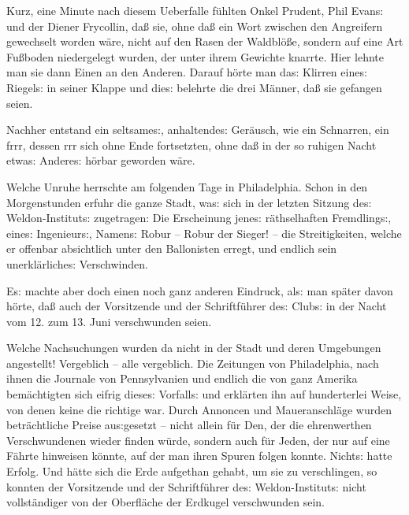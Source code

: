 \documentclass[oneside,12pt]{book}
\newcommand{\s}{s:}
\begin{document}
Kurz, eine Minute nach diesem Ueberfalle f\"uhlten Onkel Prudent,
Phil Evan{\s} und der Diener Frycollin, da{\ss} sie, ohne da{\ss} ein
Wort zwischen den Angreifern gewechselt worden w\"are, nicht auf den
Rasen der Waldbl\"o{\ss}e, sondern auf eine Art Fu{\ss}boden
niedergelegt wurden, der unter ihrem Gewichte knarrte. Hier lehnte
man sie dann Einen an den Anderen. Darauf h\"orte man da{\s} Klirren
eine{\s} Riegel{\s} in seiner Klappe und die{\s} belehrte die drei
M\"anner, da{\ss} sie gefangen seien.

Nachher entstand ein seltsame{\s}, anhaltende{\s} Ger\"ausch, wie ein
Schnarren, ein frrr, dessen rrr sich ohne Ende fortsetzten, ohne
da{\ss} in der so ruhigen Nacht etwa{\s} Andere{\s} h\"orbar geworden
w\"are.

\begin{center}
\makebox[15em]{\hrulefill}\bigskip
\end{center}

Welche Unruhe herrschte am folgenden Tage in Philadelphia. Schon in
den Morgenstunden erfuhr die ganze Stadt, wa{\s} sich in der letzten
Sitzung de{\s} Weldon-Institut{\s} zugetragen: Die Erscheinung
jene{\s} r\"athselhaften Fremdling{\s}, eine{\s} Ingenieur{\s},
Namen{\s} Robur -- Robur der Sieger! -- die Streitigkeiten, welche er
offenbar absichtlich unter den Ballonisten erregt, und endlich sein
unerkl\"arliche{\s} Verschwinden.

E{\s} machte aber doch einen noch ganz anderen Eindruck, al{\s} man
sp\"ater davon h\"orte, da{\ss} auch der Vorsitzende und der
Schriftf\"uhrer de{\s} Club{\s} in der Nacht vom 12. zum 13. Juni
verschwunden seien.

Welche Nachsuchungen wurden da nicht in der Stadt und deren
Umgebungen angestellt! Vergeblich -- alle vergeblich. Die Zeitungen
von Philadelphia, nach ihnen die Journale von Pennsylvanien und
endlich die von ganz Amerika bem\"achtigten sich eifrig diese{\s}
Vorfall{\s} und erkl\"arten ihn auf hunderterlei Weise, von denen
keine die richtige war. Durch Annoncen und Maueranschl\"age wurden
betr\"achtliche Preise au{\s}gesetzt -- nicht allein f\"ur Den, der
die ehrenwerthen Verschwundenen wieder finden w\"urde, sondern auch
f\"ur Jeden, der nur auf eine F\"ahrte hinweisen k\"onnte, auf der
man ihren Spuren folgen konnte. Nicht{\s} hatte Erfolg. Und h\"atte
sich die Erde aufgethan gehabt, um sie zu verschlingen, so konnten
der Vorsitzende und der Schriftf\"uhrer de{\s} Weldon-Institut{\s}
nicht vollst\"andiger von der Oberfl\"ache der Erdkugel verschwunden
sein.
\end{document}
